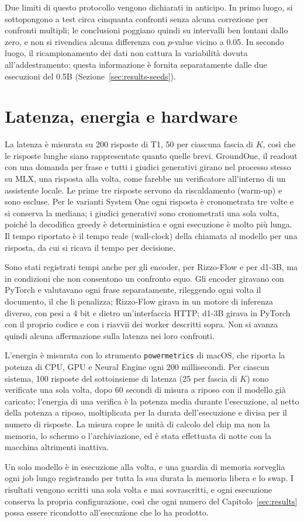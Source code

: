 Due limiti di questo protocollo vengono dichiarati in anticipo. In primo luogo, si sottopongono a test circa cinquanta
confronti senza alcuna correzione per confronti multipli; le conclusioni poggiano quindi su intervalli ben lontani dallo
zero, e non si rivendica alcuna differenza con $p$-value vicino a 0.05. In secondo luogo, il ricampionamento dei dati non
cattura la variabilità dovuta all'addestramento: questa informazione è fornita separatamente dalle due esecuzioni del
0.5B (Sezione~\ref{sec:results-seeds}).

\section{Latenza, energia e hardware}
\label{sec:setup-protocol}

La latenza è misurata su 200 risposte di T1, 50 per ciascuna fascia di $K$, così che le risposte lunghe siano
rappresentate quanto quelle brevi. GroundOne, il readout con una domanda per frase e tutti i giudici generativi girano nel
processo stesso su MLX, una risposta alla volta, come farebbe un verificatore all'interno di un assistente locale. Le
prime tre risposte servono da riscaldamento (warm-up) e sono escluse. Per le varianti System One ogni risposta è
cronometrata tre volte e si conserva la mediana; i giudici generativi sono cronometrati una sola volta, poiché la
decodifica greedy è deterministica e ogni esecuzione è molto più lunga. Il tempo riportato è il tempo reale (wall-clock)
della chiamata al modello per una risposta, da cui si ricava il tempo per decisione.

Sono stati registrati tempi anche per gli encoder, per Rizzo-Flow e per d1-3B, ma in condizioni che non consentono un
confronto equo. Gli encoder giravano con PyTorch e valutavano ogni frase separatamente, rileggendo ogni volta il
documento, il che li penalizza; Rizzo-Flow girava in un motore di inferenza diverso, con pesi a 4 bit e dietro
un'interfaccia HTTP; d1-3B girava in PyTorch con il proprio codice e con i riavvii dei worker descritti sopra. Non si
avanza quindi alcuna affermazione sulla latenza nei loro confronti.

L'energia è misurata con lo strumento \texttt{powermetrics} di macOS, che riporta la potenza di CPU, GPU e Neural Engine
ogni 200 millisecondi. Per ciascun sistema, 100 risposte del sottoinsieme di latenza (25 per fascia di $K$) sono
verificate una sola volta, dopo 60 secondi di misura a riposo con il modello già caricato; l'energia di una verifica è la
potenza media durante l'esecuzione, al netto della potenza a riposo, moltiplicata per la durata dell'esecuzione e divisa
per il numero di risposte. La misura copre le unità di calcolo del chip ma non la memoria, lo schermo o l'archiviazione,
ed è stata effettuata di notte con la macchina altrimenti inattiva.

Un solo modello è in esecuzione alla volta, e una guardia di memoria sorveglia ogni job lungo registrando per tutta la
sua durata la memoria libera e lo swap. I risultati vengono scritti una sola volta e mai sovrascritti, e ogni esecuzione
conserva la propria configurazione, così che ogni numero del Capitolo~\ref{sec:results} possa essere ricondotto
all'esecuzione che lo ha prodotto.
